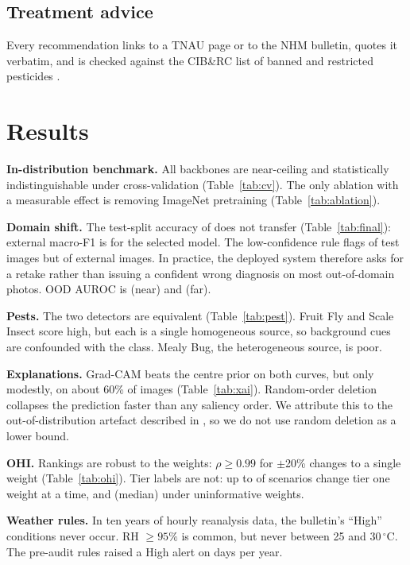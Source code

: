 \documentclass[conference]{IEEEtran}
\begin{document}
\subsection{Treatment advice}
Every recommendation links to a TNAU page \cite{tnau2026mango} or to the NHM bulletin, quotes it verbatim, and is
checked against the CIB\&RC list of banned and restricted pesticides \cite{cibrc2026banned}.

\section{Results}


\textbf{In-distribution benchmark.} All backbones are near-ceiling and statistically indistinguishable under
cross-validation (Table~\ref{tab:cv}). The only ablation with a measurable effect is removing ImageNet pretraining
(Table~\ref{tab:ablation}).

\textbf{Domain shift.} The test-split accuracy of \testAcc{} does not transfer (Table~\ref{tab:final}): external
macro-F1 is \extMacroFOne{} \extMacroFOneCI{} for the selected model. The low-confidence rule flags \testFlagged{} of
test images but \extFlagged{} of external images. In practice, the deployed system therefore asks for a retake
rather than issuing a confident wrong diagnosis on most out-of-domain photos. OOD AUROC is \aurocNear{} (near) and
\aurocFar{} (far).

\textbf{Pests.} The two detectors are equivalent (Table~\ref{tab:pest}). Fruit Fly and Scale Insect score high, but
each is a single homogeneous source, so background cues are confounded with the class. Mealy Bug, the heterogeneous
source, is poor.

\textbf{Explanations.} Grad-CAM beats the centre prior on both curves, but only modestly, on about 60\% of images
(Table~\ref{tab:xai}). Random-order deletion collapses the prediction faster than any saliency order. We attribute
this to the out-of-distribution artefact described in \cite{hooker2019roar}, so we do not use random deletion as a
lower bound.

\textbf{OHI.} Rankings are robust to the weights: $\rho\ge0.99$ for $\pm$20\% changes to a single weight
(Table~\ref{tab:ohi}). Tier labels are not: up to \ohiMaxTierChange{} of scenarios change tier one weight at a time,
and \ohiUniformTierChange{} (median) under uninformative weights.

\textbf{Weather rules.} In ten years of hourly reanalysis data, the bulletin's ``High'' conditions never occur. RH
${\ge}95\%$ is common, but never between 25 and 30\,$^\circ$C. The pre-audit rules raised a High alert on
\fcPrevHighDays{} days per year.
\end{document}
